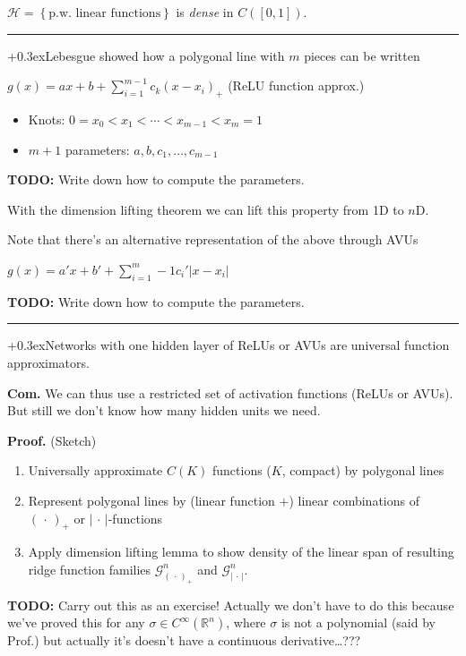 \documentclass[a2paper,8pt]{extarticle}
\newcommand{\R}{\mathbb{R}}
\newcommand{\cG}{\mathcal{G}}
\newcommand{\cH}{\mathcal{H}}
\newcommand{\set}[1]{\left\{ #1 \right\}}
\newcommand{\abs}[1]{\left\lvert #1 \right\rvert}
\newcommand{\argdot}{\,\cdot\,}
\newcommand{\todo}[1]{\textbf{TODO:} #1}
\newcommand{\todo}[1]{%
}
\newcommand{\customboxpaddingsize}{0pt}
\newcommand{\emptyarg}[1][]{\ifthenelse{\isempty{#1}}{}{\ (#1)}}
\newcommand{\Thm}[1][]{{\setlength\fboxsep{\customboxpaddingsize}
\colorbox{thmcolor}{%
\color{custtitlecolor}{\textbf{T.\emptyarg[#1]}}}\kern+0.3ex}}
\newcommand{\Com}{\textbf{Com.} }
\newcommand{\Proof}{\textbf{Proof.} }
\newcommand{\sep}{\vspace{0pt}\noindent\hrule\vspace{0pt}}
\newcommand{\ssep}{\hdashrule[1.1ex]{\linewidth}{0.1pt}{0.3mm}\vspace{-6pt}}
\newcommand{\sep}{\vspace{5pt}\noindent\hrule\vspace{5pt}}
\newcommand{\ssep}{\hdashrule[1.1ex]{\linewidth}{0.1pt}{0.3mm}\vspace{-3pt}}
\begin{document}
\begin{landscape}
\begin{multicols*}{7}
$\cH=\set{\text{p.w. linear functions}}$ is \emph{dense} in $C([0,1])$.

\sep

\Thm Lebesgue showed how a polygonal line with $m$ pieces can be written 

$
\displaystyle
g(x)=ax+b+\sum_{i=1}^{m-1} c_k(x-x_i)_{+}
$ (ReLU function approx.)

\begin{itemize}
  \item Knots: $0=x_0<x_1<\cdots <x_{m-1}<x_{m}=1$
  \item $m+1$ parameters: $a,b,c_1,\ldots,c_{m-1}$
\end{itemize}

\todo{Write down how to compute the parameters}.

With the dimension lifting theorem we can lift this property from 1D to $n$D.

\ssep

Note that there's an alternative representation of the above through AVUs

$
g(x)=a'x+b'+\sum_{i=1}^m-1 c_i'\abs{x-x_i}
$

\todo{Write down how to compute the parameters}.

\sep

\Thm Networks with one hidden layer of ReLUs or AVUs are universal function
approximators.

\Com We can thus use a restricted set of activation functions (ReLUs or AVUs).
But still we don't know how many hidden units we need.

\Proof (Sketch)

\begin{enumerate}
  \item Universally approximate $C(K)$ functions ($K$, compact) by polygonal
  lines
  \item Represent polygonal lines by (linear function $+$) linear combinations
  of $(\argdot)_+$ or $\abs{\argdot}$-functions
  \item Apply dimension lifting lemma to show density of the linear span of
  resulting ridge function families $\cG_{(\argdot)_{+}}^n$ and
  $\cG_{\abs{\argdot}}^n$.
\end{enumerate}

\todo{Carry out this as an exercise! Actually we don't have to do this because
we've proved this for any $\sigma\in C^{\infty}(\R^n)$, where $\sigma$ is not a
polynomial (said by Prof.) but actually it's doesn't have a continuous
derivative\ldots???}


\end{multicols*}
\end{landscape}
\end{document}
